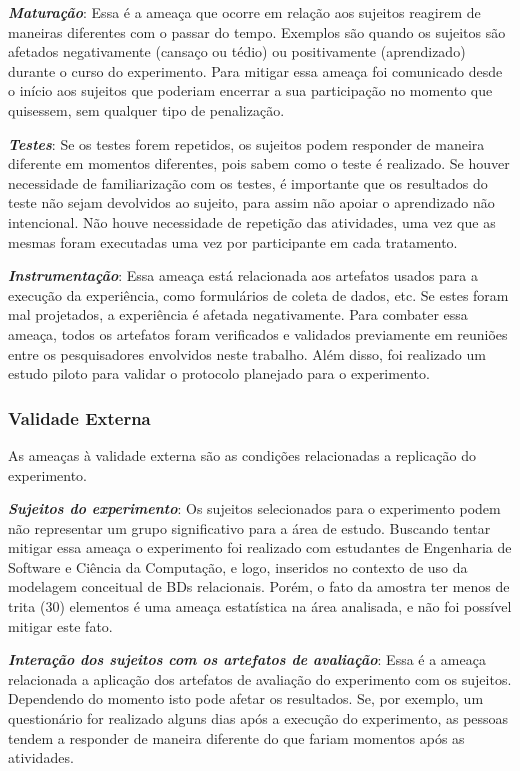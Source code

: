 \textit{\textbf{Maturação}}: Essa é a ameaça que ocorre em relação aos sujeitos reagirem de maneiras diferentes com o passar do tempo. 
Exemplos são quando os sujeitos são afetados negativamente (cansaço ou tédio) ou positivamente (aprendizado) durante o curso do experimento.
Para mitigar essa ameaça foi comunicado desde o início aos sujeitos que poderiam encerrar a sua participação no momento que quisessem, sem qualquer tipo de penalização.

\textit{\textbf{Testes}}: Se os testes forem repetidos, os sujeitos podem responder de maneira diferente em momentos diferentes, pois sabem como o teste é realizado. 
Se houver necessidade de familiarização com os testes, é importante que os resultados do teste não sejam devolvidos ao sujeito, para assim não apoiar o aprendizado não intencional. 
Não houve necessidade de repetição das atividades, uma vez que as mesmas foram executadas uma vez por participante em cada tratamento.

\textit{\textbf{Instrumentação}}: Essa ameaça está relacionada aos artefatos usados para a execução da experiência, como formulários de coleta de dados, etc.
Se estes foram mal projetados, a experiência é afetada negativamente.
Para combater essa ameaça, todos os artefatos foram verificados e validados previamente em reuniões entre os pesquisadores envolvidos neste trabalho.
Além disso, foi realizado um estudo piloto para validar o protocolo planejado para o experimento.

\subsubsection{Validade Externa}

As ameaças à validade externa são as condições relacionadas a replicação do experimento.

\textit{\textbf{Sujeitos do experimento}}: Os sujeitos selecionados para o experimento podem não representar um grupo significativo para a área de estudo. 
Buscando tentar mitigar essa ameaça o experimento foi realizado com estudantes de Engenharia de Software e Ciência da Computação, e logo, inseridos no contexto de uso da modelagem conceitual de \acp{BD} relacionais.
Porém, o fato da amostra ter menos de trita (30) elementos é uma ameaça estatística na área analisada, e não foi possível mitigar este fato.

\textit{\textbf{Interação dos sujeitos com os artefatos de avaliação}}: Essa é a ameaça relacionada a aplicação dos artefatos de avaliação do experimento com os sujeitos.
Dependendo do momento isto pode afetar os resultados.
Se, por exemplo, um questionário for realizado alguns dias após a execução do experimento, as pessoas tendem a responder de maneira diferente do que fariam momentos após as atividades.

